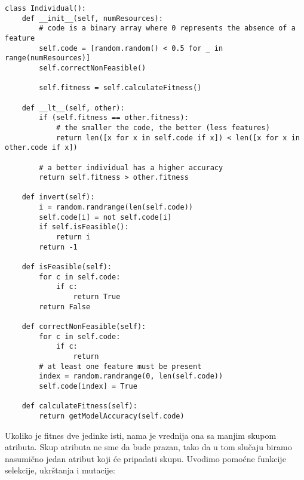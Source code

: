 \documentclass[11pt]{article} %
\begin{document}
\begin{lstlisting}
class Individual():
    def __init__(self, numResources):
        # code is a binary array where 0 represents the absence of a feature
        self.code = [random.random() < 0.5 for _ in range(numResources)]
        self.correctNonFeasible()
        
        self.fitness = self.calculateFitness()
        
    def __lt__(self, other):
        if (self.fitness == other.fitness):
            # the smaller the code, the better (less features)
            return len([x for x in self.code if x]) < len([x for x in other.code if x])
        
        # a better individual has a higher accuracy
        return self.fitness > other.fitness
        
    def invert(self):
        i = random.randrange(len(self.code))
        self.code[i] = not self.code[i]
        if self.isFeasible():
            return i
        return -1
    
    def isFeasible(self):
        for c in self.code:
            if c:
                return True
        return False
        
    def correctNonFeasible(self):
        for c in self.code:
            if c:
                return
        # at least one feature must be present
        index = random.randrange(0, len(self.code))
        self.code[index] = True
        
    def calculateFitness(self):
        return getModelAccuracy(self.code)
\end{lstlisting}

Ukoliko je fitnes dve jedinke isti, nama je vrednija ona sa manjim skupom atributa. Skup atributa ne sme da bude prazan, tako da u tom slučaju biramo nasumično jedan atribut koji će pripadati skupu.\newline
Uvodimo pomoćne funkcije selekcije, ukrštanja i mutacije:
\end{document}
